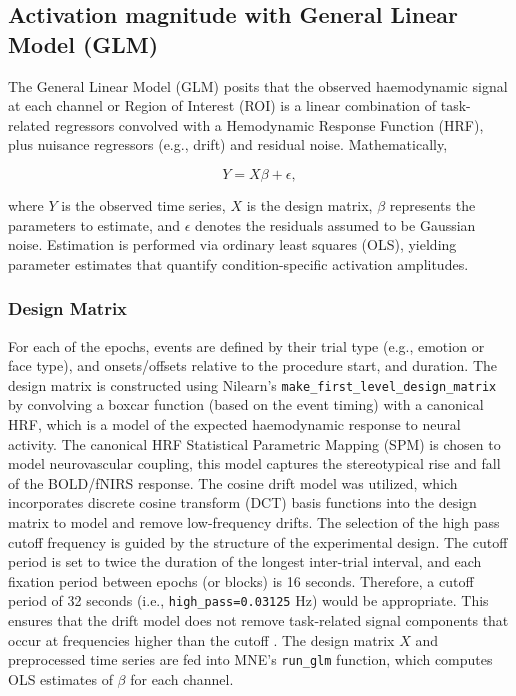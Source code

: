 \subsection{Activation magnitude with General Linear Model (GLM)}
\label{sec:GLM}
The General Linear Model (GLM) posits that the observed haemodynamic signal at each channel or Region of Interest (ROI) is a linear combination of task-related regressors convolved with a Hemodynamic Response Function (HRF), plus nuisance regressors (e.g., drift) and residual noise. Mathematically, 

\begin{equation}
Y = X\beta + \epsilon,
\end{equation}

where \( Y \) is the observed time series, \( X \) is the design matrix, \( \beta \) represents the parameters to estimate, and \( \epsilon \) denotes the residuals assumed to be Gaussian noise.
Estimation is performed via ordinary least squares (OLS), yielding parameter estimates that quantify condition-specific activation amplitudes.

\subsubsection{Design Matrix}
For each of the epochs, events are defined by their trial type (e.g., emotion or face type), and onsets/offsets relative to the procedure start, and duration.
The design matrix is constructed using Nilearn's \texttt{make\_first\_level\_design\_matrix} by convolving a boxcar function (based on the event timing) with a canonical HRF, which is a model of the expected haemodynamic response to neural activity.
The canonical HRF Statistical Parametric Mapping (SPM) \citep{friston_statistical_2007} is chosen to model neurovascular coupling, this model captures the stereotypical rise and fall of the BOLD/fNIRS response. 
The cosine drift model was utilized, which incorporates discrete cosine transform (DCT) basis functions into the design matrix to model and remove low-frequency drifts.
The selection of the high pass cutoff frequency is guided by the structure of the experimental design. 
The cutoff period is set to twice the duration of the longest inter-trial interval, and each fixation period between epochs (or blocks) is 16 seconds. 
Therefore, a cutoff period of 32 seconds (i.e., \texttt{high\_pass=0.03125} Hz) would be appropriate. 
This ensures that the drift model does not remove task-related signal components that occur at frequencies higher than the cutoff \citep{luke_analysis_2021}.
The design matrix \( X \) and preprocessed time series are fed into MNE's \texttt{run\_glm} function, which computes OLS estimates of \( \beta \) for each channel.

